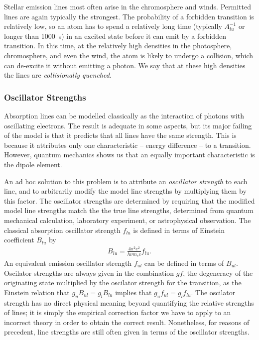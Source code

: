Stellar emission lines most often arise in the chromosphere
and winds.  Permitted lines
are again typically the strongest. The probability of a forbidden transition is
relatively low, so an atom has to spend a relatively long
time (typically $A_{lu}^{-1}$ or longer than 1000~s) in an excited state
before it can emit by a forbidden transition. In this time,
at the relatively high densities in the photosphere,
chromosphere, and even the wind, the atom is likely to
undergo a collision, which can de-excite it without emitting
a photon. We say that at these high densities the lines are
\emph{collisionally quenched}.

\subsubsection{Oscillator Strengths}

Absorption lines can be modelled classically as the
interaction of photons with oscillating electrons. The
result is adequate in some aspects, but its major failing of
the model is that it predicts that all lines have the same
strength. This is because it attributes only one characteristic -- energy
difference -- to a transition. However, quantum mechanics shows us that an equally important characteristic is the dipole element.

An ad hoc solution to this problem is to attribute an
\emph{oscillator strength} to each line, and to arbitrarily
modify the model line strengths by multiplying them by this
factor. The oscillator strengths are determined by requiring
that the modified model line strengths match the the true
line strengths, determined from quantum mechanical
calculation, laboratory experiment, or astrophysical
observation. The classical absorption oscillator strength
$f_{lu}$ is defined in terms of Einstein coefficient
$B_{lu}$ by
\begin{align}
B_{lu} = \frac{4\pi^2 e^2}{h\nu m_e c} f_{lu}.
\end{align}
An equivalent emission oscillator strength $f_{ul}$ can be
defined in terms of $B_{ul}$. Oscilator strengths are always
given in the combination $gf$, the degeneracy of the
originating state multiplied by the oscilator strength for
the transition, as the Einstein relation that $g_u B_{ul} =
g_l B_{lu}$ implies that $g_u f_{ul} = g_l f_{lu}$. The
oscilator strength has no direct physical meaning beyond
quantifying the relative strengths of lines; it is simply
the empirical correction factor we have to apply to an
incorrect theory in order to obtain the correct result.
Nonetheless, for reasons of precedent, line strengths are
still often given in terms of the oscillator strengths.

